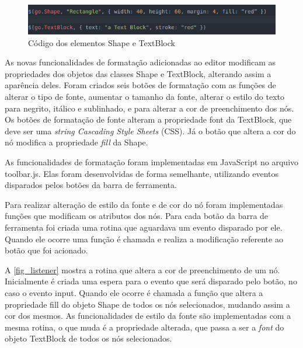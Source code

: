 \documentclass[
	12pt,				%
	openright,			%
	oneside,			%
	a4paper,			%
	english,			%
	french,				%
	spanish,			%
	brazil				%
	]{abntex2}
\begin{document}
\begin{figure}[htb]
	\caption{\label{fig_gojselements} Código dos elementos Shape e TextBlock}
	\begin{center}
		\includegraphics[scale=0.6]{gojselements.png}
	\end{center}
\end{figure}

As novas funcionalidades de formatação adicionadas ao editor modificam as propriedades dos objetos das classes Shape e TextBlock, alterando assim a aparência deles. Foram criados seis botões de formatação com as funções de alterar o tipo de fonte, aumentar o tamanho da fonte, alterar o estilo do texto para negrito, itálico e sublinhado, e para alterar a cor de preenchimento dos nós. Os botões de formatação de fonte alteram a propriedade font da TextBlock, que deve ser uma \textit{string Cascading Style Sheets} (CSS). Já o botão que altera a cor do nó modifica a propriedade \textit{fill} da Shape.

As funcionalidades de formatação foram implementadas em JavaScript no arquivo toolbar.js. Elas foram desenvolvidas de forma semelhante, utilizando eventos disparados pelos botões da barra de ferramenta.

Para realizar alteração de estilo da fonte e de cor do nó foram implementadas funções que modificam os atributos dos nós. Para cada botão da barra de ferramenta foi criada uma rotina que aguardava um evento disparado por ele. Quando ele ocorre uma função é chamada e realiza a modificação referente ao botão que foi acionado. 

A \autoref{fig_listener} mostra a rotina que altera a cor de preenchimento de um nó. Inicialmente é criada uma espera para o evento que será disparado pelo botão, no caso o evento input. Quando ele ocorre é chamada a função que altera a propriedade fill do objeto Shape de todos os nós selecionados, mudando assim a cor dos mesmos. As funcionalidades de estilo da fonte são implementadas com a mesma rotina, o que muda é a propriedade alterada, que passa a ser a \textit{font} do objeto TextBlock de todos os nós selecionados.    
\end{document}
